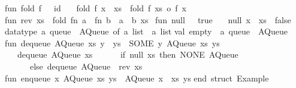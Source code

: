 \begin{isabellebody}
\begin{isamarkuptext}
\begin{typewriter}
\isanewline
fun\ fold\ f\ {\isacharbrackleft}{\isacharbrackright}\ {\isacharequal}\ id\isanewline
\ \ {\isacharbar}\ fold\ f\ {\isacharparenleft}x\ {\isacharcolon}{\isacharcolon}\ xs{\isacharparenright}\ {\isacharequal}\ fold\ f\ xs\ o\ f\ x{\isacharsemicolon}\isanewline
\isanewline
fun\ rev\ xs\ {\isacharequal}\ fold\ {\isacharparenleft}fn\ a\ {\isacharequal}{\isachargreater}\ fn\ b\ {\isacharequal}{\isachargreater}\ a\ {\isacharcolon}{\isacharcolon}\ b{\isacharparenright}\ xs\ {\isacharbrackleft}{\isacharbrackright}{\isacharsemicolon}\isanewline
\isanewline
fun\ null\ {\isacharbrackleft}{\isacharbrackright}\ {\isacharequal}\ true\isanewline
\ \ {\isacharbar}\ null\ {\isacharparenleft}x\ {\isacharcolon}{\isacharcolon}\ xs{\isacharparenright}\ {\isacharequal}\ false{\isacharsemicolon}\isanewline
\isanewline
datatype\ {\isacharprime}a\ queue\ {\isacharequal}\ AQueue\ of\ {\isacharprime}a\ list\ {\isacharasterisk}\ {\isacharprime}a\ list{\isacharsemicolon}\isanewline
\isanewline
val\ empty\ {\isacharcolon}\ {\isacharprime}a\ queue\ {\isacharequal}\ AQueue\ {\isacharparenleft}{\isacharbrackleft}{\isacharbrackright}{\isacharcomma}\ {\isacharbrackleft}{\isacharbrackright}{\isacharparenright}{\isacharsemicolon}\isanewline
\isanewline
fun\ dequeue\ {\isacharparenleft}AQueue\ {\isacharparenleft}xs{\isacharcomma}\ y\ {\isacharcolon}{\isacharcolon}\ ys{\isacharparenright}{\isacharparenright}\ {\isacharequal}\ {\isacharparenleft}SOME\ y{\isacharcomma}\ AQueue\ {\isacharparenleft}xs{\isacharcomma}\ ys{\isacharparenright}{\isacharparenright}\isanewline
\ \ {\isacharbar}\ dequeue\ {\isacharparenleft}AQueue\ {\isacharparenleft}xs{\isacharcomma}\ {\isacharbrackleft}{\isacharbrackright}{\isacharparenright}{\isacharparenright}\ {\isacharequal}\isanewline
\ \ \ \ {\isacharparenleft}if\ null\ xs\ then\ {\isacharparenleft}NONE{\isacharcomma}\ AQueue\ {\isacharparenleft}{\isacharbrackleft}{\isacharbrackright}{\isacharcomma}\ {\isacharbrackleft}{\isacharbrackright}{\isacharparenright}{\isacharparenright}\isanewline
\ \ \ \ \ \ else\ dequeue\ {\isacharparenleft}AQueue\ {\isacharparenleft}{\isacharbrackleft}{\isacharbrackright}{\isacharcomma}\ rev\ xs{\isacharparenright}{\isacharparenright}{\isacharparenright}{\isacharsemicolon}\isanewline
\isanewline
fun\ enqueue\ x\ {\isacharparenleft}AQueue\ {\isacharparenleft}xs{\isacharcomma}\ ys{\isacharparenright}{\isacharparenright}\ {\isacharequal}\ AQueue\ {\isacharparenleft}x\ {\isacharcolon}{\isacharcolon}\ xs{\isacharcomma}\ ys{\isacharparenright}{\isacharsemicolon}\isanewline
\isanewline
end{\isacharsemicolon}\ {\isacharparenleft}{\isacharasterisk}struct\ Example{\isacharasterisk}{\isacharparenright}\isanewline


\end{typewriter}
\end{isamarkuptext}
\end{isabellebody}
